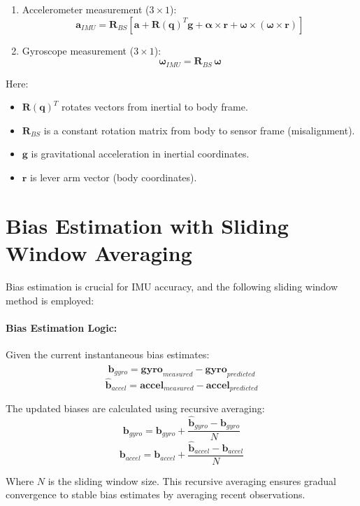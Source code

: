 \documentclass{article}
\begin{document}
	\begin{enumerate}
		\item Accelerometer measurement ($3\times1$):
		\[
		\mathbf{a}_{IMU} = \mathbf{R}_{BS}\left[\mathbf{a} + \mathbf{R(q)}^T \mathbf{g} + \boldsymbol{\alpha}\times \mathbf{r} + \boldsymbol{\omega}\times(\boldsymbol{\omega}\times \mathbf{r})\right]
		\]

		\item Gyroscope measurement ($3\times1$):
		\[
		\boldsymbol{\omega}_{IMU} = \mathbf{R}_{BS}\,\boldsymbol{\omega}
		\]
	\end{enumerate}

	Here:
	\begin{itemize}
		\item $\mathbf{R(q)}^T$ rotates vectors from inertial to body frame.
		\item $\mathbf{R}_{BS}$ is a constant rotation matrix from body to sensor frame (misalignment).
		\item $\mathbf{g}$ is gravitational acceleration in inertial coordinates.
		\item $\mathbf{r}$ is lever arm vector (body coordinates).
	\end{itemize}

	\section*{Bias Estimation with Sliding Window Averaging}
	Bias estimation is crucial for IMU accuracy, and the following sliding window method is employed:

	\paragraph{Bias Estimation Logic:} Given the current instantaneous bias estimates:
	\[
	\hat{\mathbf{b}}_{gyro} = \mathbf{gyro}_{measured} - \mathbf{gyro}_{predicted}
	\]
	\[
	\hat{\mathbf{b}}_{accel} = \mathbf{accel}_{measured} - \mathbf{accel}_{predicted}
	\]

	The updated biases are calculated using recursive averaging:
	\[
	\mathbf{b}_{gyro} = \mathbf{b}_{gyro} + \frac{\hat{\mathbf{b}}_{gyro} - \mathbf{b}_{gyro}}{N}
	\]
	\[
	\mathbf{b}_{accel} = \mathbf{b}_{accel} + \frac{\hat{\mathbf{b}}_{accel} - \mathbf{b}_{accel}}{N}
	\]

	Where $N$ is the sliding window size. This recursive averaging ensures gradual convergence to stable bias estimates by averaging recent observations.
\end{document}
